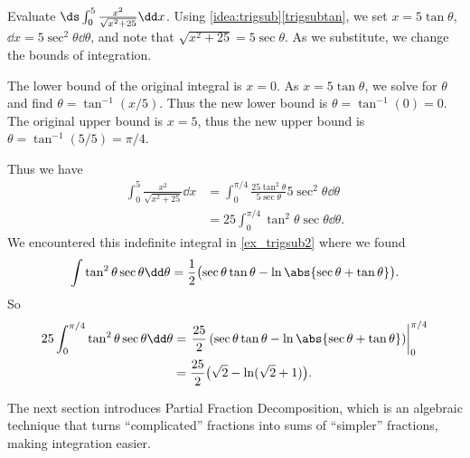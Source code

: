 \begin{example}\label{ex_trigsub6}%
Evaluate $\ds\int_0^5\frac{x^2}{\sqrt{x^2+25}}\dd x$.
\solution
Using \autoref{idea:trigsub}\ref*{trigsubtan}, we set $x=5\tan\theta$, $\dd x = 5\sec^2\theta\dd\theta$, and note that $\sqrt{x^2+25} = 5\sec\theta$. As we substitute, we change the bounds of integration.

The lower bound of the original integral is $x=0$. As $x=5\tan\theta$, we solve for $\theta$ and find $\theta = \tan^{-1}(x/5)$. Thus the new lower bound is $\theta = \tan^{-1}(0) = 0$. The original upper bound is $x=5$, thus the new upper bound is $\theta = \tan^{-1}(5/5) = \pi/4$. 

Thus we have 
\begin{align*}
\int_0^5\frac{x^2}{\sqrt{x^2+25}}\dd x &= \int_0^{\pi/4} \frac{25\tan^2\theta}{5\sec\theta}5\sec^2\theta\dd\theta\\
		&= 25\int_0^{\pi/4} \tan^2\theta\sec\theta\dd\theta.
\end{align*}
We encountered this indefinite integral in \autoref{ex_trigsub2} where we found 
\[\int \tan^2\theta\sec\theta \dd\theta = \frac12\bigl(\sec\theta\tan\theta-\ln\abs{\sec\theta+\tan\theta}\bigr).\]
So
\begin{align*}
	25\int_0^{\pi/4} \tan^2\theta\sec\theta\dd\theta
	&= \left.\frac{25}2\left(\sec\theta\tan\theta-\ln\abs{\sec\theta+\tan\theta}\right)\right|_0^{\pi/4}\\
	&= \frac{25}2\bigl(\sqrt2-\ln(\sqrt2+1)\bigr)
	.
\end{align*}
\end{example}

%

The next section introduces Partial Fraction Decomposition, which is an algebraic technique that turns ``complicated'' fractions into sums of ``simpler'' fractions, making integration easier.

